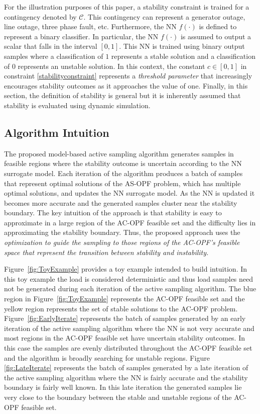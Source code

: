 \documentclass[lettersize,journal]{IEEEtran}
\begin{document}
For the illustration purposes of this paper, a stability constraint is trained for a contingency denoted by $\mathcal{C}$.  This contingency can represent a generator outage, line outage, three phase fault, etc.  Furthermore, the NN $f(\cdot)$ is defined to represent a binary classifier.  In particular, the NN $f(\cdot)$ is assumed to output a scalar that falls in the interval $[0,1]$.  This NN is trained using binary output samples where a classification of $1$ represents a stable solution and a classification of $0$ represents an unstable solution. In this context, the constant $c\in[0,1]$ in constraint \eqref{stabilityconstraint} represents a \emph{threshold parameter} that increasingly encourages stability outcomes as it approaches the value of one.  Finally, in this section, the definition of stability is general but it is inherently assumed that stability is evaluated using dynamic simulation. 

\subsection{Algorithm Intuition}
The proposed model-based active sampling algorithm generates samples in feasible regions where the stability outcome is uncertain according to the NN surrogate model. Each iteration of the algorithm produces a batch of samples that represent optimal solutions of the AS-OPF problem, which has multiple optimal solutions, and updates the NN surrogate model.  As the NN is updated it becomes more accurate and the generated samples cluster near the stability boundary. The key intuition of the approach is that stability is easy to approximate in a large region of the AC-OPF feasible set and the difficulty lies in approximating the stability boundary.  Thus, the proposed approach uses the \emph{optimization to guide the sampling to those regions of the AC-OPF's feasible space that represent the transition between stability and instability.}

Figure~\ref{fig:ToyExample} provides a toy example intended to build intuition.  In this toy example the load is considered deterministic and thus load samples need not be generated during each iteration of the active sampling algorithm.  The blue region in Figure~\ref{fig:ToyExample} represents the AC-OPF feasible set and the yellow region represents the set of stable solutions to the AC-OPF problem.  Figure~\ref{fig:EarlyIterate} represents the batch of samples generated by an early iteration of the active sampling algorithm where the NN is not very accurate and most regions in the AC-OPF feasible set have uncertain stability outcomes.  In this case the samples are evenly distributed throughout the AC-OPF feasible set and the algorithm is broadly searching for unstable regions.  Figure \ref{fig:LateIterate} represents the batch of samples generated by a late iteration of the active sampling algorithm where the NN is fairly accurate and the stability boundary is fairly well known.  In this late iteration the generated samples lie very close to the boundary between the stable and unstable regions of the AC-OPF feasible set. 
\end{document}
